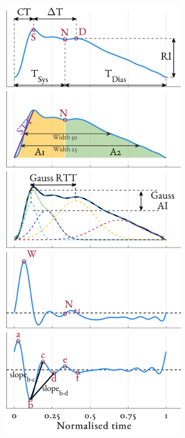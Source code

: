 \documentclass[fleqn,10pt]{wlscirep}
\begin{document}
\begin{figure}[ht]
\begin{subfigure}{.24\textwidth}
		\caption{}
	\end{subfigure}
	~
	\begin{subfigure}{.24\textwidth}
		\centering
		\includegraphics[height = \figHeight]{PPG_feats_dose_increase.png}

\end{subfigure}
\end{figure}
\end{document}

